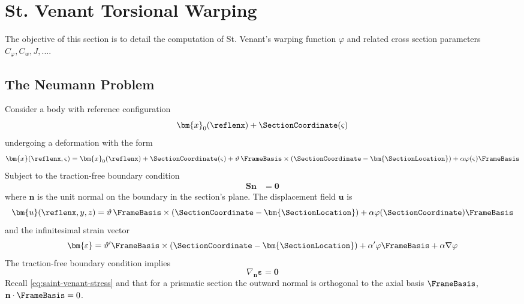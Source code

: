 \section{St. Venant Torsional Warping}\label{sec:torsion-warping}

The objective of this section is to detail the computation of St. Venant's warping function \(\varphi\) and related cross section parameters \(C_{\varphi}, C_w, J, ...\).

\subsection{The Neumann Problem}
Consider a body with reference configuration 
\begin{equation*}
    \bm{x}_0(\reflenx) + \SectionCoordinate(\varsigma)
\end{equation*}
undergoing a deformation with the form
\begin{equation*}
    \bm{x}(\reflenx, \varsigma ) = \bm{x}_0(\reflenx) + \SectionCoordinate(\varsigma) + \vartheta \, \FrameBasis\times(\SectionCoordinate - \bm{\SectionLocation}) + \alpha \varphi(\varsigma) \FrameBasis
\end{equation*}
Subject to the traction-free boundary condition
\begin{equation*}
\begin{aligned}
    \bm{S}\mathbf{n} &= \bm{0}
\end{aligned}
\end{equation*}
where \(\mathbf{n}\) is the unit normal on the boundary in the section's plane. 
The displacement field \(\bm{u}\) is 
\begin{equation*}
\bm{u}(\reflenx, y, z) =
\vartheta \, \FrameBasis\times(\SectionCoordinate - \bm{\SectionLocation}) + \alpha \varphi(\SectionCoordinate) \FrameBasis
\end{equation*}
and the infinitesimal strain vector
\begin{equation*}
\bm{\varepsilon} = \vartheta' \FrameBasis \times (\SectionCoordinate - \bm{\SectionLocation}) + \alpha' \varphi \FrameBasis + \alpha \nabla \varphi
\end{equation*}
The traction-free boundary condition implies
\begin{equation*}
    \nabla_{\mathbf{n}}\bm{\varepsilon} = \bm{0}
\end{equation*}
Recall \cref{eq:saint-venant-stress} and that for a prismatic section the outward normal is orthogonal to the axial basis \(\FrameBasis\), \(\mathbf{n}\cdot \FrameBasis = 0\).
